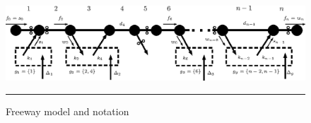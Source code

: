\begin{figure}[t]
	\centering
	\includegraphics[width=7in]{figures/scheme.eps}
%
	\rule{7in}{0.3pt}
	\caption{Freeway model and notation}
	\label{fig:scheme}
\end{figure}
